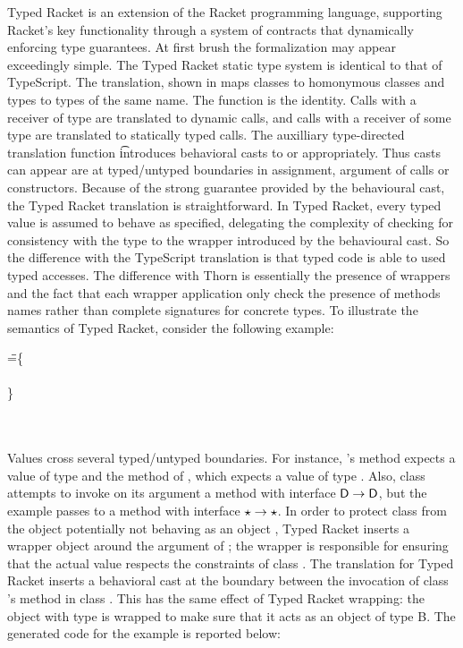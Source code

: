 \documentclass[acmlarge, anonymous, authordraft, review]{acmart} %
\begin{document}
Typed Racket is an extension of the Racket programming language, supporting
Racket's key functionality through a system of contracts that dynamically
enforcing type guarantees.  At first brush the formalization may appear
exceedingly simple.  The Typed Racket static type system is identical to
that of TypeScript. The translation, shown in  maps classes to
homonymous classes and types to types of the same name. The  function
is the identity.  Calls with a receiver of type \any are translated to
\kafka dynamic calls, and calls with a receiver of some type \C are
translated to statically typed calls. The auxilliary type-directed
translation function \TAG\e\Env\t introduces behavioral casts to \any or \C
appropriately. Thus casts can appear are at typed/untyped boundaries in
assignment, argument of calls or constructors. Because of the strong
guarantee provided by the behavioural cast, the Typed Racket translation is
straightforward. In Typed Racket, every typed value is assumed to behave as
specified, delegating the complexity of checking for consistency with the
type to the wrapper introduced by the behavioural cast.  So the difference
with the TypeScript translation is that typed code is able to used typed
accesses. The difference with Thorn is essentially the presence of wrappers
and the fact that each wrapper application only check the presence of
methods names rather than complete signatures for concrete types.  To
illustrate the semantics of Typed Racket, consider the following example:

\medskip
\begin{tabbing}
 \HS\HS\HS
  \Call{\New\A{}}\m{\New\C{}}
  \HS\HS\HS\HS \WHERE \HS\K\HS=\HS\=
  \class\=  \A \{ \\
  \>\> \Mdef\m\x\any\any{ ~ \Call{\New\D{}}\m\x ~} \\
  \> \}\\
 \> \Class \C{}{\Mdef\m\x\any\any{~\x~}} \\
 \> \Class \D{}{\Mdef\m\x\D\D{~\Call\x\m\x~}} \\
\end{tabbing}
\medskip

\noindent Values cross several typed/untyped boundaries.  For instance, \A's
method \m expects a value of type \any and the method \n of \D, which
expects a value of type \D.  Also, class \D attempts to invoke on its
argument a method \m with interface \(\D \to \D\), but the example passes to
\D a method \m with interface \(\star \to \star\).  In order to protect class
\D from the object \C potentially not behaving as an object \D, Typed Racket
inserts a wrapper object around the argument of \D; the wrapper is
responsible for ensuring that the actual value respects the constraints of
class \D.  The \kafka translation for Typed Racket inserts a behavioral cast
at the boundary between the invocation of class \D's method \m in class \A.
This has the same effect of Typed Racket wrapping: the object with type \C
is wrapped to make sure that it acts as an object of type {\xt B}.  The
generated \kafka code for the example is reported below:
\end{document}
